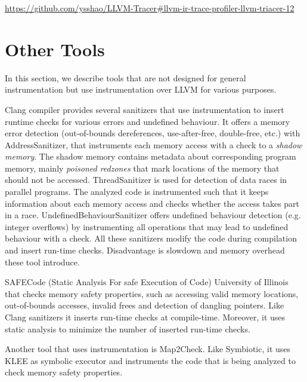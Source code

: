 \url{https://github.com/ysshao/LLVM-Tracer#llvm-ir-trace-profiler-llvm-triacer-12}

\section{Other Tools}

In this section, we describe tools that are not designed for general
instrumentation but use instrumentation over LLVM for various purposes.

Clang compiler provides several sanitizers that use instrumentation to insert
runtime checks for various errors and undefined behaviour. It offers a memory
error detection (out-of-bounds dereferences, use-after-free, double-free, etc.)
with AddressSanitizer, that instruments each memory access with a check to a
\textit{shadow memory}. The shadow memory contains metadata about corresponding
program memory, mainly \textit{poisoned redzones} that mark locations of the
memory that should not be accessed. ThreadSanitizer is used for detection of
data races in parallel programs. The analyzed code is instrumented such that it
keeps information about each memory access and checks whether the access takes
part in a race. UndefinedBehaviourSanitizer offers undefined behaviour
detection (e.g. integer overflows) by instrumenting all operations that may
lead to undefined behaviour with a check. All these sanitizers modify the code
during compilation and insert run-time checks.  Disadvantage is slowdown and
memory overhead these tool introduce.

SAFECode (Static Analysis For safe Execution of Code)
University of Illinois that checks memory safety properties, such as accessing
valid memory locations, out-of-bounds accesses, invalid frees and detection of
dangling pointers. Like Clang sanitizers it inserts run-time checks at
compile-time. Moreover, it uses static analysis to minimize the number of
inserted run-time checks.

Another tool that uses instrumentation is Map2Check. Like Symbiotic, it uses
KLEE as symbolic executor and instruments the code that is being analyzed to
check memory safety properties.
